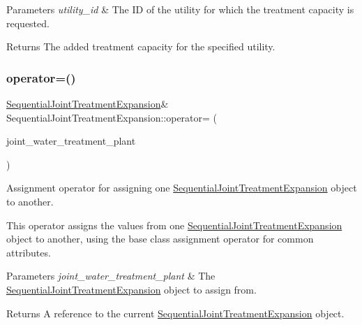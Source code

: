\begin{DoxyParams}{Parameters}
{\em utility\+\_\+id} & The ID of the utility for which the treatment capacity is requested.\\
\hline
\end{DoxyParams}
\begin{DoxyReturn}{Returns}
The added treatment capacity for the specified utility. 
\end{DoxyReturn}
\mbox{\label{classSequentialJointTreatmentExpansion_a8e09c31e292155c17d0d670aaf767862}} 
\subsubsection{\texorpdfstring{operator=()}{operator=()}}
{\footnotesize\ttfamily \mbox{\hyperlink{classSequentialJointTreatmentExpansion}{Sequential\+Joint\+Treatment\+Expansion}}\& Sequential\+Joint\+Treatment\+Expansion\+::operator= (\begin{DoxyParamCaption}\item[{const \mbox{\hyperlink{classSequentialJointTreatmentExpansion}{Sequential\+Joint\+Treatment\+Expansion}} \&}]{joint\+\_\+water\+\_\+treatment\+\_\+plant }\end{DoxyParamCaption})}



Assignment operator for assigning one \mbox{\hyperlink{classSequentialJointTreatmentExpansion}{Sequential\+Joint\+Treatment\+Expansion}} object to another. 

This operator assigns the values from one {\ttfamily \mbox{\hyperlink{classSequentialJointTreatmentExpansion}{Sequential\+Joint\+Treatment\+Expansion}}} object to another, using the base class assignment operator for common attributes.


\begin{DoxyParams}{Parameters}
{\em joint\+\_\+water\+\_\+treatment\+\_\+plant} & The {\ttfamily \mbox{\hyperlink{classSequentialJointTreatmentExpansion}{Sequential\+Joint\+Treatment\+Expansion}}} object to assign from.\\
\hline
\end{DoxyParams}
\begin{DoxyReturn}{Returns}
A reference to the current {\ttfamily \mbox{\hyperlink{classSequentialJointTreatmentExpansion}{Sequential\+Joint\+Treatment\+Expansion}}} object. 
\end{DoxyReturn}


